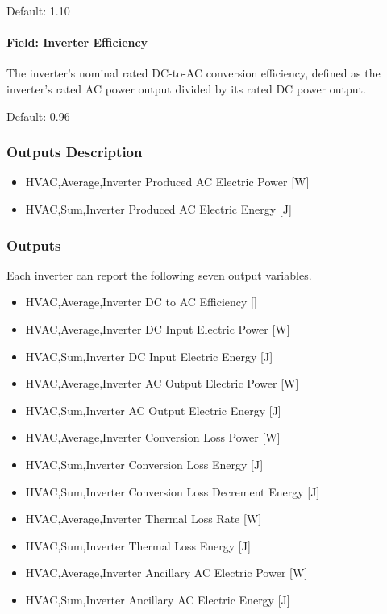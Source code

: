 Default: 1.10

\paragraph{Field: Inverter Efficiency}\label{field-inverter-efficiency-electricloadcenterinverterpvwatts}

The inverter's nominal rated DC-to-AC conversion efficiency, defined as
the inverter's rated AC power output divided by its rated DC power
output.

Default: 0.96

\subsubsection{Outputs Description}\label{outputs-description-electricloadcenterinverterpvwatts}

\begin{itemize}
\item
  HVAC,Average,Inverter Produced AC Electric Power {[}W{]}
\item
  HVAC,Sum,Inverter Produced AC Electric Energy {[}J{]}
\end{itemize}

\subsubsection{Outputs}\label{outputs-3-005}

Each inverter can report the following seven output variables.

\begin{itemize}
\tightlist
\item
  HVAC,Average,Inverter DC to AC Efficiency {[]}
\item
  HVAC,Average,Inverter DC Input Electric Power {[}W{]}
\item
  HVAC,Sum,Inverter DC Input Electric Energy {[}J{]}
\item
  HVAC,Average,Inverter AC Output Electric Power {[}W{]}
\item
  HVAC,Sum,Inverter AC Output Electric Energy {[}J{]}
\item
  HVAC,Average,Inverter Conversion Loss Power {[}W{]}
\item
  HVAC,Sum,Inverter Conversion Loss Energy {[}J{]}
\item
  HVAC,Sum,Inverter Conversion Loss Decrement Energy {[}J{]}
\item
  HVAC,Average,Inverter Thermal Loss Rate {[}W{]}
\item
  HVAC,Sum,Inverter Thermal Loss Energy {[}J{]}
\item
  HVAC,Average,Inverter Ancillary AC Electric Power {[}W{]}
\item
  HVAC,Sum,Inverter Ancillary AC Electric Energy {[}J{]}
\end{itemize}

